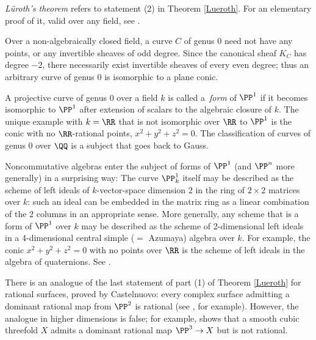 \begin{fact}
\emph{L\"uroth's theorem} refers to statement (2) in Theorem \ref{Lueroth}.
%
For an elementary proof of it, valid over any
field, see
\cite[Section 8.13]{JacobsonII}.

Over a non-algebraically closed field, a curve $C$ of genus 0 need not
have any points, or any invertible sheaves of odd degree. Since the
canonical sheaf $K_C$ has degree $-2$, there necessarily exist
invertible sheaves of every even degree; thus an arbitrary curve of
%
genus 0 is isomorphic to a  plane conic.

A projective curve of genus 0 over a field $k$ is called a
\,\emph{form}
%
of $\PP^1$ if it becomes isomorphic to $\PP^1$ after extension
of scalars to
the algebraic closure of $k$. The unique example with $k = \RR$ that
is not isomorphic over $\RR$ to $\PP^1$
is the conic with no $\RR$-rational points, $x^2+y^2+z^2 = 0$.
The classification of curves of genus 0 over $\QQ$ is a subject that goes back to Gauss.



Noncommutative algebras enter the subject of forms of $\PP^1$ (and
$\PP^n$ more generally) in a surprising way: The curve $\PP_k^1$
itself may be described as the scheme of
%
left ideals of $k$-vector-space dimension 2 in the ring of
$2\times 2$ matrices over $k$: such an ideal can be embedded in the
matrix ring as a linear combination of the 2 columns in an appropriate sense.
More generally, any scheme that is a form of $\PP^1$ over $k$
may be described as the scheme of 2-dimensional left ideals in a
4-dimensional central simple ($=$
Azumaya) algebra
%
over $k$. For example, the
conic $x^2+y^2+z^2 = 0$ with no points over $\RR$ is the scheme of
left ideals in the algebra of
quaternions.
%
See \cite[Section X.6]{Serre1979}.

 There is an analogue
of the last statement of part (1) of Theorem \ref{Lueroth}
for rational surfaces,
proved
by
%
Castelnuovo: every complex surface admitting a dominant rational
map from $\PP^2$ is rational (see \cite[Corollary V.5]{Beauville}, for
example).
However, the analogue in higher
dimensions
is false; for example, \cite{MR0302652} shows that a smooth cubic threefold $X$ admits a dominant rational map $\PP^3 \to X$ but is not rational.

\end{fact}


